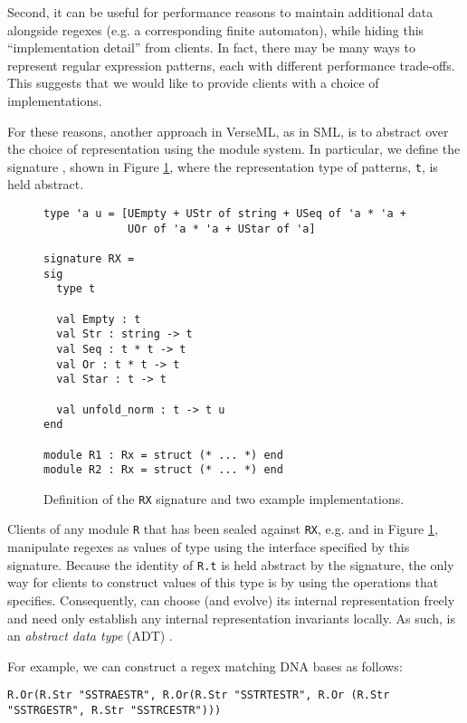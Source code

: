 Second, it can be useful for performance reasons to maintain additional data alongside regexes (e.g. a corresponding finite automaton), while hiding this ``implementation detail'' from clients. In fact, there may be many ways to represent regular expression patterns, each with different performance trade-offs. This suggests that we would like to provide clients with a choice of implementations. 

For these reasons, another approach in VerseML, as in SML, is to abstract over the choice of representation using  the module system. In particular, we define the {signature} , shown in Figure \ref{fig:signature-RX}, where the representation type of patterns, \lstinline{t}, is held abstract.

\begin{figure}[ht]
\begin{lstlisting}[deletekeywords={case},numbers=none]
type 'a u = [UEmpty + UStr of string + USeq of 'a * 'a + 
             UOr of 'a * 'a + UStar of 'a]

signature RX = 
sig
  type t

  val Empty : t
  val Str : string -> t
  val Seq : t * t -> t
  val Or : t * t -> t
  val Star : t -> t

  val unfold_norm : t -> t u
end

module R1 : Rx = struct (* ... *) end
module R2 : Rx = struct (* ... *) end
\end{lstlisting}
\vspace{-5px}
\caption{Definition of the \lstinline{RX} signature and two example implementations.}
\label{fig:signature-RX}
\end{figure}

Clients of any module \lstinline{R} that has been sealed against \lstinline{RX}, e.g.  and   in Figure \ref{fig:signature-RX}, manipulate regexes as values of type  using the interface specified by this signature. Because the identity of \lstinline{R.t} is held abstract by the signature, the only way for clients to construct values of this type is by using the operations that  specifies. Consequently,  can  choose (and evolve) its internal representation freely and need only establish any internal representation invariants locally. As such,  is an \emph{abstract data type} (ADT) \cite{liskov1974programming}.

For example, we can construct a regex matching DNA bases as follows:
\begin{lstlisting}[numbers=none]
R.Or(R.Str "SSTRAESTR", R.Or(R.Str "SSTRTESTR", R.Or (R.Str "SSTRGESTR", R.Str "SSTRCESTR")))
\end{lstlisting}

